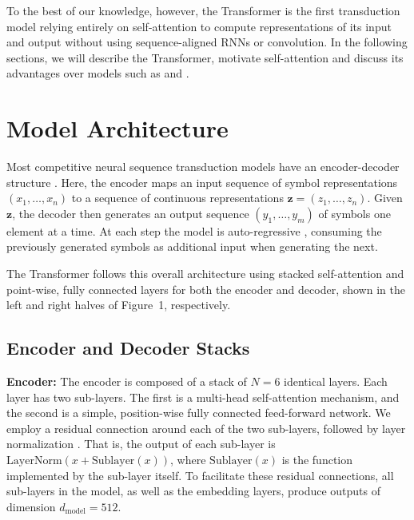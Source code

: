 To the best of our knowledge, however, the Transformer is the first transduction
model relying entirely on self-attention to compute representations of its input
and output without using sequence-aligned RNNs or convolution. In the following
sections, we will describe the Transformer, motivate self-attention and discuss
its advantages over models such as
\cite{sutskever2014sequence,bahdanau2014neural} and
\cite{recurrentleastsquares,lecun2015deep}.

\section{Model Architecture}

Most competitive neural sequence transduction models have an encoder-decoder
structure \cite{cho2014learning,bahdanau2014neural,sutskever2014sequence}. Here,
the encoder maps an input sequence of symbol representations
$(x_1, \ldots, x_n)$ to a sequence of continuous representations
$\mathbf{z} = (z_1, \ldots, z_n)$. Given $\mathbf{z}$, the decoder then
generates an output sequence $(y_1, \ldots, y_m)$ of symbols one element at a
time. At each step the model is auto-regressive \cite{graves2013generating},
consuming the previously generated symbols as additional input when generating
the next.

The Transformer follows this overall architecture using stacked self-attention
and point-wise, fully connected layers for both the encoder and decoder, shown
in the left and right halves of Figure~1, respectively.

\subsection{Encoder and Decoder Stacks}

\textbf{Encoder:} The encoder is composed of a stack of $N = 6$ identical
layers. Each layer has two sub-layers. The first is a multi-head self-attention
mechanism, and the second is a simple, position-wise fully connected
feed-forward network. We employ a residual connection
\cite{he2016deep} around each of the two sub-layers, followed by layer
normalization \cite{ba2016layer}. That is, the output of each sub-layer is
$\mathrm{LayerNorm}(x + \mathrm{Sublayer}(x))$, where $\mathrm{Sublayer}(x)$
is the function implemented by the sub-layer itself. To facilitate these
residual connections, all sub-layers in the model, as well as the embedding
layers, produce outputs of dimension $d_{\text{model}} = 512$.

